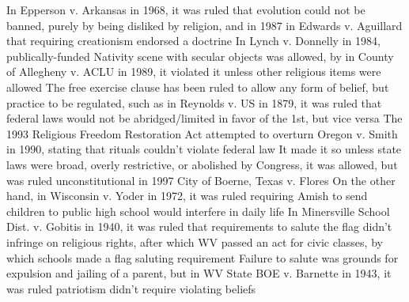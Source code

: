 \documentclass[11 pt, twoside]{article}
\newenvironment{outline*}
{
	\begin{outline}[enumerate]
	}
	{\end{outline}
}
\begin{document}
\begin{outline*}
\1 In Epperson v. Arkansas in 1968, it was ruled that evolution could not be banned, purely by being disliked by religion, and in 1987 in Edwards v. Aguillard that requiring creationism endorsed a doctrine
\1 In Lynch v. Donnelly in 1984, publically-funded Nativity scene with secular objects was allowed, by in County of Allegheny v. ACLU in 1989, it violated it unless other religious items were allowed
\1 The free exercise clause has been ruled to allow any form of belief, but practice to be regulated, such as in Reynolds v. US in 1879, it was ruled that federal laws would not be abridged/limited in favor of the 1st, but vice versa
\2 The 1993 Religious Freedom Restoration Act attempted to overturn Oregon v. Smith in 1990, stating that rituals couldn’t violate federal law
\2 It made it so unless state laws were broad, overly restrictive, or abolished by Congress, it was allowed, but was ruled unconstitutional in 1997 City of Boerne, Texas v. Flores
\2 On the other hand, in Wisconsin v. Yoder in 1972, it was ruled requiring Amish to send children to public high school would interfere in daily life
\1 In Minersville School Dist. v. Gobitis in 1940, it was ruled that requirements to salute the flag didn’t infringe on religious rights, after which WV passed an act for civic classes, by which schools made a flag saluting requirement
\2 Failure to salute was grounds for expulsion and jailing of a parent, but in WV State BOE v. Barnette in 1943, it was ruled patriotism didn’t require violating beliefs
\end{outline*}
\end{document}
